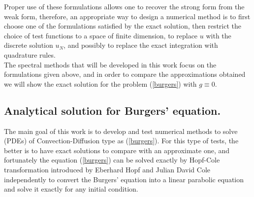 	Proper use of these formulations allows one to recover the strong form from the weak form, therefore, an appropriate way to design a numerical method is to first choose one of the formulations satisfied by the exact solution, then restrict the choice of test functions to a space of finite dimension, to replace $u$ with the discrete solution $u_N$, and possibly to replace the exact integration with quadrature rules. \\
	
	The spectral methods that will be developed in this work focus on the formulations given above, and in order to compare the approximations obtained we will show the exact solution for the problem (\ref{burgers}) with $ g \equiv 0 $.
   
    \subsection{Analytical solution for Burgers' equation.}
    
    The main goal of this work is to develop and test numerical methods to solve (PDEs) of Convection-Diffusion type as (\ref{burgers}). For this type of tests, the better is to have exact solutions to compare with an approximate one, and fortunately the equation (\ref{burgers}) can be solved exactly by Hopf-Cole transformation introduced by Eberhard Hopf \cite{Hopf1950} and Julian David Cole \cite{Cole1951} independently to convert the Burgers' equation into a linear parabolic equation and solve it exactly for any initial condition. \\
  

